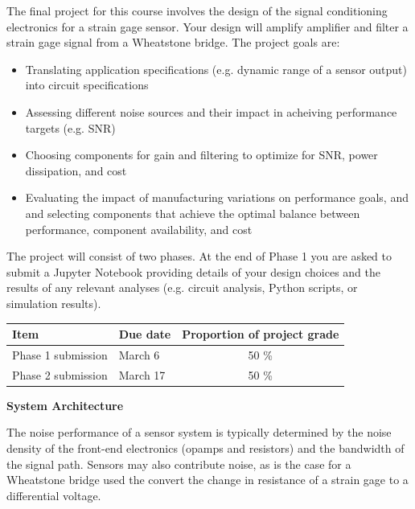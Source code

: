 \documentclass[11pt]{article}
\begin{document}
The final project for this course involves the design of the signal conditioning electronics for a strain gage sensor. Your design will amplify amplifier and filter a strain gage signal from a Wheatstone bridge. The project goals are:

\begin{itemize}
    \setlength{\itemsep}{0pt}
    \item Translating application specifications (e.g. dynamic range of a sensor output) into circuit specifications
    \item Assessing different noise sources and their impact in acheiving performance targets (e.g. SNR)
    \item Choosing components for gain and filtering to optimize for SNR, power dissipation, and cost
    \item Evaluating the impact of manufacturing variations on performance goals, and and selecting components that achieve the optimal balance between performance, component availability, and cost
\end{itemize}

The project will consist of two phases. At the end of Phase 1 you are asked to submit a Jupyter Notebook providing details of your design choices and the results of any relevant analyses (e.g. circuit analysis, Python scripts, or simulation results).

\begin{center}
\renewcommand{\arraystretch}{1.5}
\begin{tabular}{llc}
\textbf{Item} & \textbf{Due date} & \textbf{Proportion of project grade} \\
\hline
Phase 1 submission & March 6 & 50 \% \\
Phase 2 submission & March 17 & 50 \% \\
\end{tabular}
\end{center}

\vspace{1em}
\textbf{\Large System Architecture}

The noise performance of a sensor system is typically determined by the noise density of the front-end electronics (opamps and resistors) and the bandwidth of the signal path. Sensors may also contribute noise, as is the case for a Wheatstone bridge used the convert the change in resistance of a strain gage to a differential voltage.
\end{document}
